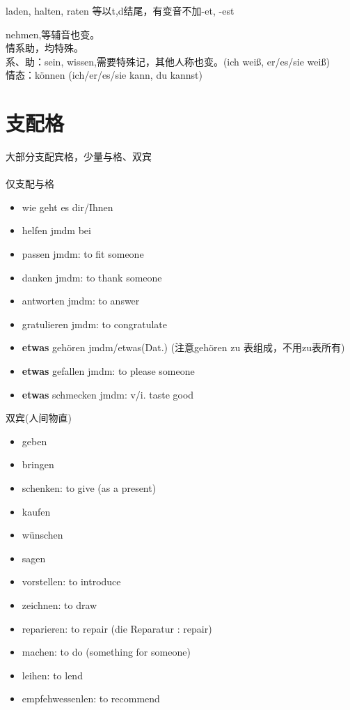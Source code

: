 laden, halten, raten 等以t,d结尾，有变音不加-et, -est

\noindent
nehmen,等辅音也变。 \\
情系助，均特殊。\\
系、助：sein, wissen,需要特殊记，其他人称也变。(ich weiß, er/es/sie weiß) \\
情态：können (ich/er/es/sie kann, du kannst) \\

\section{支配格}
大部分支配宾格，少量与格、双宾\\
\\
仅支配与格
\begin{itemize}
    \item wie geht es dir/Ihnen
    \item helfen jmdm bei
    \item passen jmdm: to fit someone
    \item danken jmdm: to thank someone
    \item antworten jmdm: to answer
    \item gratulieren jmdm: to congratulate
    \item \textbf{etwas} gehören jmdm/etwas(Dat.) (注意gehören zu 表组成，不用zu表所有)
    \item \textbf{etwas} gefallen jmdm: to please someone
    \item \textbf{etwas} schmecken jmdm: v/i. taste good
\end{itemize}
双宾(人间物直)
\begin{itemize}
    \item geben
    \item bringen
    \item schenken: to give (as a present)
    \item kaufen
    \item wünschen
    \item sagen
    \item vorstellen: to introduce
    \item zeichnen: to draw
    \item reparieren: to repair (die Reparatur \sqr[color=yellow]: repair)
    \item machen: to do (something for someone)
    \item leihen: to lend
    \item empfehwessenlen: to recommend
\end{itemize}

